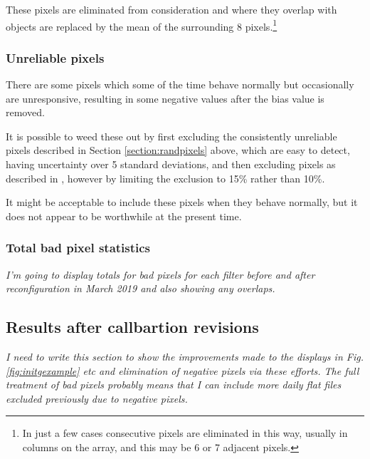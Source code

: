 These pixels are eliminated from consideration and where they overlap with
objects are replaced by the mean of the surrounding 8 pixels.\footnote{In just
a few cases consecutive pixels are eliminated in this way, usually in columns
on the array, and this may be 6 or 7 adjacent pixels.}

\subsubsection{Unreliable pixels}
\protect\label{section:unreliable pixels}

There are some pixels which some of the time behave normally but occasionally
are unresponsive, resulting in some negative values after the bias value is
removed.

It is possible to weed these out by first excluding the consistently unreliable
pixels described in Section \ref{section:randpixels} above, which are easy to
detect, having uncertainty over 5 standard deviations, and then excluding pixels
as described in \citet{allers20}, however by limiting the exclusion to 15\%
rather than 10\%.

It might be acceptable to include these pixels when they behave normally, but it
does not appear to be worthwhile at the present time.

\subsubsection{Total bad pixel statistics}
\protect\label{section:totalbadpix}

\textit{I'm going to display totals for bad pixels for each filter before and
after reconfiguration in March 2019 and also showing any overlaps.}

\subsection{Results after callbartion revisions}
\protect\label{section:postcalibration}

\textit{I need to write this section to show the improvements made to the
displays in Fig. \ref{fig:initgexample} etc and elimination of negative pixels
via these efforts. The full treatment of bad pixels probably means that I can
include more daily flat files excluded previously due to negative pixels.}

\clearpage
 
